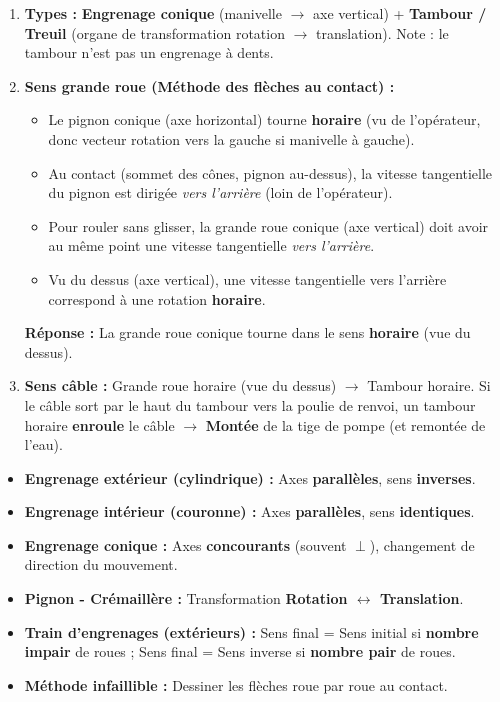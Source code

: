 \documentclass[11pt]{article}
\begin{document}
\begin{corrige}
\begin{enumerate}
\item \textbf{Types :} \textbf{Engrenage conique} (manivelle $\rightarrow$ axe vertical) + \textbf{Tambour / Treuil} (organe de transformation rotation $\rightarrow$ translation). Note : le tambour n'est pas un engrenage à dents.
\item \textbf{Sens grande roue (Méthode des flèches au contact) :}
  \begin{itemize}
  \item Le pignon conique (axe horizontal) tourne \textbf{horaire} (vu de l'opérateur, donc vecteur rotation vers la gauche si manivelle à gauche).
  \item Au contact (sommet des cônes, pignon au-dessus), la vitesse tangentielle du pignon est dirigée \emph{vers l'arrière} (loin de l'opérateur).
  \item Pour rouler sans glisser, la grande roue conique (axe vertical) doit avoir au même point une vitesse tangentielle \emph{vers l'arrière}.
  \item Vu du dessus (axe vertical), une vitesse tangentielle vers l'arrière correspond à une rotation \textbf{horaire}.
  \end{itemize}
  \textbf{Réponse :} La grande roue conique tourne dans le sens \textbf{horaire} (vue du dessus).
\item \textbf{Sens câble :} Grande roue horaire (vue du dessus) $\rightarrow$ Tambour horaire. Si le câble sort par le haut du tambour vers la poulie de renvoi, un tambour horaire \textbf{enroule} le câble $\rightarrow$ \textbf{Montée} de la tige de pompe (et remontée de l'eau).
\end{enumerate}
\end{corrige}

\begin{aretenir}
\begin{itemize}
\item \textbf{Engrenage extérieur (cylindrique) :} Axes \textbf{parallèles}, sens \textbf{inverses}.
\item \textbf{Engrenage intérieur (couronne) :} Axes \textbf{parallèles}, sens \textbf{identiques}.
\item \textbf{Engrenage conique :} Axes \textbf{concourants} (souvent $\perp$), changement de direction du mouvement.
\item \textbf{Pignon - Crémaillère :} Transformation \textbf{Rotation $\leftrightarrow$ Translation}.
\item \textbf{Train d'engrenages (extérieurs) :} Sens final = Sens initial si \textbf{nombre impair} de roues ; Sens final = Sens inverse si \textbf{nombre pair} de roues.
\item \textbf{Méthode infaillible :} Dessiner les flèches roue par roue au contact.
\end{itemize}
\end{aretenir}
\end{document}
